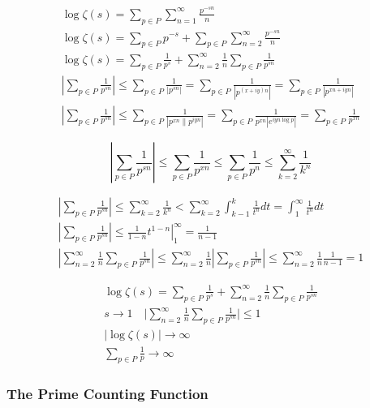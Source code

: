 	$$
	\begin{gathered}
		\log \zeta(s)=\sum_{p \in P} \sum_{n=1}^{\infty} \frac{p^{-s n}}{n} \\
		\log \zeta(s)=\sum_{p \in P} p^{-s}+\sum_{p \in P} \sum_{n=2}^{\infty} \frac{p^{-s n}}{n} \\
		\log \zeta(s)=\sum_{p \in P} \frac{1}{p^s}+\sum_{n=2}^{\infty} \frac{1}{n} \sum_{p \in P} \frac{1}{p^{s n}} \\
		\left|\sum_{p \in P} \frac{1}{p^{s n}}\right| \leq \sum_{p \in P} \frac{1}{\left|p^{s n}\right|}=\sum_{p \in P} \frac{1}{\left|p^{(x+i y) n}\right|}=\sum_{p \in P} \frac{1}{\left|p^{x n+i y n}\right|} \\
		\left|\sum_{p \in P} \frac{1}{p^{s n} }\right| \leq \sum_{p \in P} \frac{1}{\left|p^{x n} \| p^{i y n}\right|}=\sum_{p \in P} \frac{1}{p^{x n}\left|e^{i y n \log p}\right|}=\sum_{p \in P} \frac{1}{p^{x n}}
	\end{gathered}
	$$
	
	$$
	\left|\sum_{p \in P} \frac{1}{p^{s n}}\right| \leq \sum_{p \in P} \frac{1}{p^{x n}} \leq \sum_{p \in P} \frac{1}{p^n} \leq \sum_{k=2}^{\infty} \frac{1}{k^n}
	$$
	
	$$
	\begin{gathered}
		\left|\sum_{p \in P} \frac{1}{p^{s n}}\right| \leq \sum_{k=2}^{\infty} \frac{1}{k^n}<\sum_{k=2}^{\infty} \int_{k-1}^k \frac{1}{t^n} d t=\int_1^{\infty} \frac{1}{t^n} d t \\
		\left|\sum_{p \in P} \frac{1}{p^{s n}}\right| \leq\left.\frac{1}{1-n} t^{1-n}\right|_1 ^{\infty}=\frac{1}{n-1} \\
		\left|\sum_{n=2}^{\infty} \frac{1}{n} \sum_{p \in P} \frac{1}{p^{s n}}\right| \leq \sum_{n=2}^{\infty} \frac{1}{n}\left|\sum_{p \in P} \frac{1}{p^{s n}}\right| \leq \sum_{n=2}^{\infty} \frac{1}{n} \frac{1}{n-1}=1
	\end{gathered}
	$$
	
	$$
	\begin{gathered}
		\log \zeta(s)=\sum_{p \in P} \frac{1}{p^s}+\sum_{n=2}^{\infty} \frac{1}{n} \sum_{p \in P} \frac{1}{p^{s n}} \\
		s \rightarrow 1 \quad \big| \sum_{n=2}^{\infty} \frac{1}{n} \sum_{p \in P} \frac{1}{p^{s n}} \big| \leq 1 \\
		|\log \zeta(s)| \rightarrow \infty \\
		\sum_{p \in P} \frac{1}{p} \rightarrow \infty
	\end{gathered}
	$$
	
	\subsubsection{The Prime Counting Function}
	
